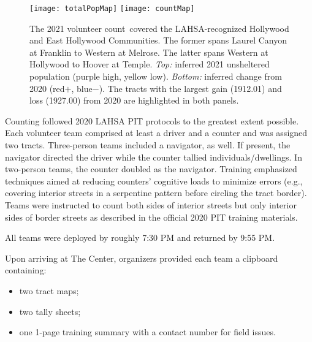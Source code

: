 \documentclass[11pt,twocolumn]{article}
\def\Count{count}
\begin{document}
\begin{figure}[t!]
	\centering
	\texttt{[image: totalPopMap]}
	\texttt{[image: countMap]}
	\caption{The 2021 volunteer \Count\ covered the LAHSA-recognized Hollywood and East 
			Hollywood Communities. The former spans Laurel Canyon at Franklin to Western
			at Melrose. The latter spans Western at Hollywood to Hoover at Temple. 
			{\it Top:} inferred 2021 unsheltered population (purple high, yellow low). 
			{\it Bottom:} inferred change from 2020 (red$+$, blue$-$). The tracts with the 
			largest gain (1912.01) and loss (1927.00) from 2020 are highlighted
			in both panels.}
	\label{fig:map}	
\end{figure}

Counting followed 2020 LAHSA PIT protocols to the greatest extent possible. Each volunteer team 
comprised at least a driver and a counter and was assigned two tracts. Three-person teams 
included a navigator, as well. If present, the navigator directed the driver while the counter tallied 
individuals/dwellings. In two-person teams, the counter doubled as the navigator. Training 
emphasized techniques aimed at reducing counters' cognitive loads to minimize errors (e.g., 
covering interior streets in a serpentine pattern before circling the tract border). Teams were 
instructed to count both sides of interior streets but only interior sides of border streets 
as described in the official 2020 PIT training materials.

All teams were deployed by roughly 7:30 PM and returned by 9:55 PM.

Upon arriving at The Center, organizers provided each team a clipboard containing:
\begin{itemize}
	\item two tract maps;
	\item two tally sheets;
	\item one 1-page training summary with a contact number for field issues.
\end{itemize}
\end{document}
